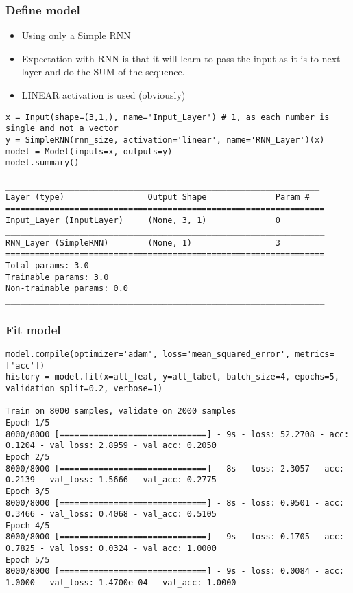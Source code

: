 \begin{frame}[fragile] \frametitle{Define model}
\begin{itemize}
\item Using only a Simple RNN
\item Expectation with RNN is that it will learn to pass the input as it is to next layer and do the SUM of the sequence.
\item LINEAR activation is used (obviously)
\end{itemize}


\begin{lstlisting}
x = Input(shape=(3,1,), name='Input_Layer') # 1, as each number is single and not a vector
y = SimpleRNN(rnn_size, activation='linear', name='RNN_Layer')(x)
model = Model(inputs=x, outputs=y)
model.summary()

________________________________________________________________
Layer (type)                 Output Shape              Param #   
=================================================================
Input_Layer (InputLayer)     (None, 3, 1)              0         
_________________________________________________________________
RNN_Layer (SimpleRNN)        (None, 1)                 3         
=================================================================
Total params: 3.0
Trainable params: 3.0
Non-trainable params: 0.0
_________________________________________________________________
\end{lstlisting}
\end{frame}

\begin{frame}[fragile] \frametitle{Fit model}

\begin{lstlisting}
model.compile(optimizer='adam', loss='mean_squared_error', metrics=['acc'])
history = model.fit(x=all_feat, y=all_label, batch_size=4, epochs=5, validation_split=0.2, verbose=1)

Train on 8000 samples, validate on 2000 samples
Epoch 1/5
8000/8000 [==============================] - 9s - loss: 52.2708 - acc: 0.1204 - val_loss: 2.8959 - val_acc: 0.2050
Epoch 2/5
8000/8000 [==============================] - 8s - loss: 2.3057 - acc: 0.2139 - val_loss: 1.5666 - val_acc: 0.2775
Epoch 3/5
8000/8000 [==============================] - 8s - loss: 0.9501 - acc: 0.3466 - val_loss: 0.4068 - val_acc: 0.5105
Epoch 4/5
8000/8000 [==============================] - 9s - loss: 0.1705 - acc: 0.7825 - val_loss: 0.0324 - val_acc: 1.0000
Epoch 5/5
8000/8000 [==============================] - 9s - loss: 0.0084 - acc: 1.0000 - val_loss: 1.4700e-04 - val_acc: 1.0000
\end{lstlisting}
\end{frame}

